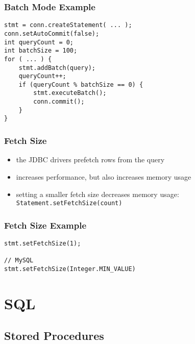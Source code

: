 \documentclass[dvipsnames]{beamer}
\theoremstyle{plain}
\begin{document}
\begin{frame}[fragile]
  \frametitle{Batch Mode Example}

  \begin{block}{}
    \begin{lstlisting}
stmt = conn.createStatement( ... );
conn.setAutoCommit(false);
int queryCount = 0;
int batchSize = 100;
for ( ... ) {
    stmt.addBatch(query);
    queryCount++;
    if (queryCount % batchSize == 0) {
        stmt.executeBatch();
        conn.commit();
    }
}
    \end{lstlisting}
  \end{block}
\end{frame}

\begin{frame}
  \frametitle{Fetch Size}

  \begin{itemize}
    \item the JDBC drivers prefetch rows from the query
    \item increases performance, but also increases memory usage

    \pause
    \medskip
    \item setting a smaller fetch size decreases memory usage:\\
      \lstinline!Statement.setFetchSize(count)!
  \end{itemize}
\end{frame}

\begin{frame}[fragile]
  \frametitle{Fetch Size Example}

  \begin{block}{}
    \begin{lstlisting}
stmt.setFetchSize(1);

// MySQL
stmt.setFetchSize(Integer.MIN_VALUE)
    \end{lstlisting}
  \end{block}
\end{frame}

\lstset{language=ExtendedSQL}

\section{SQL}

\subsection{Stored Procedures}
\end{document}

